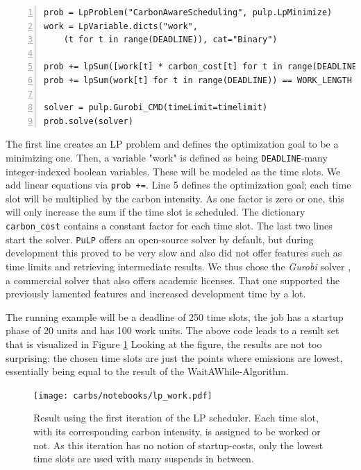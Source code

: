 \begin{minipage}{\linewidth}
\begin{lstlisting}[frame=single, numbers=left, caption={LP Implementation for basic scheduling}, label={list:lp_work}, basicstyle=\ttfamily, breaklines]
prob = LpProblem("CarbonAwareScheduling", pulp.LpMinimize)
work = LpVariable.dicts("work", 
    (t for t in range(DEADLINE)), cat="Binary")

prob += lpSum([work[t] * carbon_cost[t] for t in range(DEADLINE)]) 
prob += lpSum(work[t] for t in range(DEADLINE)) == WORK_LENGTH 

solver = pulp.Gurobi_CMD(timeLimit=timelimit)
prob.solve(solver)
\end{lstlisting}
\end{minipage}

The first line creates an LP problem and defines the optimization goal to be a minimizing one. 
Then, a variable "work" is defined as being \verb|DEADLINE|-many integer-indexed boolean variables. 
These will be modeled as the time slots. 
We add linear equations via \verb|prob +=|.
Line 5 defines the optimization goal; each time slot will be multiplied by the carbon intensity. As one factor is zero or one, this will only increase the sum if the time slot is scheduled. The dictionary \verb|carbon_cost| contains a constant factor for each time slot.
The last two lines start the solver. 
\verb|PuLP| offers an open-source solver by default, but during development this proved to be very slow and also did not offer features such as time limits and retrieving intermediate results.
We thus chose the \emph{Gurobi} solver , a commercial solver that also offers academic licenses.
That one supported the previously lamented features and increased development time by a lot. 

The running example will be a deadline of 250 time slots, the job has a startup phase of 20 units and has 100 work units. 
The above code leads to a result set that is visualized in Figure \ref{fig:lp_work}
Looking at the figure, the results are not too surprising: the chosen time slots are just the points where emissions are lowest, essentially being equal to the result of the WaitAWhile-Algorithm.

\begin{figure}[H]
    \texttt{[image: carbs/notebooks/lp\_work.pdf]}
    \caption{Result using the first iteration of the LP scheduler. Each time slot, with its corresponding carbon intensity, is assigned to be worked or not. As this iteration has no notion of startup-costs, only the lowest time slots are used with many suspends in between.}
    \label{fig:lp_work}
\end{figure}    

